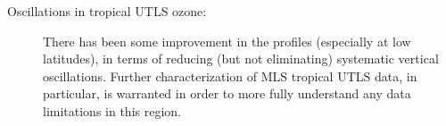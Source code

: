 \documentclass[11pt,draft]{report}
\makeatletter
\renewcommand{\subsection}{\@startsection%
  {subsection}%
  {2}%
  {0pt}%
  {-2pt plus -1pt minus -2pt}%
  {2pt plus 1pt minus 2pt}%
  {\large\sffamily\fontseries{sb}\selectfont\flushleft\color{SectionColor}\figureversion{tabular}}}%
\makeatother
\begin{document}
\begin{description}  
\item[Oscillations in tropical UTLS ozone:] There has been some improvement 
  in the \thisv profiles (especially at low latitudes), in terms of reducing 
  (but not eliminating) systematic vertical oscillations. Further characterization 
  of MLS tropical UTLS data, in particular, is warranted
  in order to more fully understand any data limitations in this region.

\end{description}   
 
 
\end{document}
